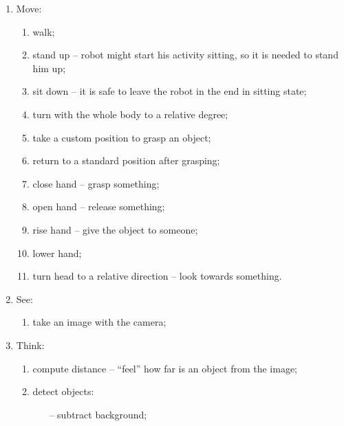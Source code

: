             \begin{enumerate}[topsep=2pt, partopsep=0pt,itemsep=0pt,parsep=1pt]
                \item Move:
                    \begin{enumerate}[topsep=1pt, partopsep=0pt,itemsep=0pt,parsep=1pt]
                        \item walk;
                        \item stand up -- robot might start his activity sitting, so it is needed to stand him up;
                        \item sit down -- it is safe to leave the robot in the end in sitting state;
                        \item turn with the whole body to a relative degree;
                        \item take a custom position to grasp an object;
                        \item return to a standard position after grasping;
                        \item close hand -- grasp something;
                        \item open hand -- release something;
                        \item rise hand -- give the object to someone;
                        \item lower hand;
                        \item turn head to a relative direction -- look towards something.
                    \end{enumerate}
                \item See:
                    \begin{enumerate}[topsep=1pt, partopsep=0pt,itemsep=0pt,parsep=1pt]
                        \item take an image with the camera;
                    \end{enumerate}
                \item Think:
                    \begin{enumerate}[topsep=1pt, partopsep=0pt,itemsep=0pt,parsep=1pt]
                        \item compute distance -- ``feel'' how far is an object from the image;
                        \item detect objects:
                            \begin{itemize}[topsep=1pt, partopsep=0pt,itemsep=0pt,parsep=1pt]
                                \item[--] subtract background;

\end{itemize}
\end{enumerate}
\end{enumerate}
